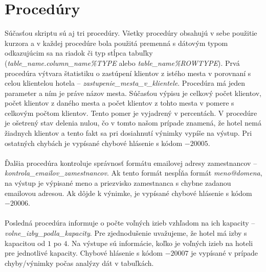 \documentclass[a4paper,11pt,titlepage]{article}[11.3.2016]
\begin{document}
\section{Procedúry}
Súčasťou skriptu sú aj tri procedúry. Všetky procedúry obsahujú v sebe použitie kurzora a v každej procedúre bola použitá premenná s dátovým typom odkazujúcim sa na riadok či typ stĺpca tabuľky (\textit{table\_name.column\_name\%TYPE} alebo \textit{table\_name\%ROWTYPE}). Prvá procedúra výtvara štatistiku o zastúpení klientov z istého mesta v porovnaní s celou klientelou hotela -- \textit{zastupenie\_mesta\_v\_klientele}.
Procedúra má jeden parameter a ním je práve názov mesta. Súčasťou výpisu je celkový počet klientov, počet klientov z daného mesta a počet klientov z tohto mesta v pomere s celkovým počtom klientov. Tento pomer je vyjadrený v percentách. V procedúre je ošetrený stav delenia nulou, čo v tomto našom prípade znamená, že hotel nemá žiadnych klientov a tento fakt sa pri dosiahnutí výnimky vypíše na výstup. Pri ostatných chybách je vypísané chybové hlásenie s kódom $-20005$.\\
\\
Ďalšia procedúra kontroluje správnosť formátu emailovej adresy zamestnancov -- \textit{kontrola\_emailov\_zamestnancov}. Ak tento formát nespĺňa formát \textit{meno@domena}, na výstup je výpisané meno a priezvisko zamestnanca s chybne zadanou emailovou adresou. Ak dôjde k výnimke, je vypísané chybové hlásenie s kódom $-20006$.\\
\\
Posledná procedúra informuje o počte voľných izieb vzhľadom na ich kapacity -- \textit{volne\_izby\_podla\_kapacity}. Pre zjednodušenie uvažujeme, že hotel má izby s kapacitou od $1$ po $4$. Na výstupe sú informácie, koľko je voľných izieb na hoteli pre jednotlivé kapacity. Chybové hlásenie s kódom $-20007$ je vypísané v prípade chyby/výnimky počas analýzy dát v tabuľkách.

\newpage
\end{document}

